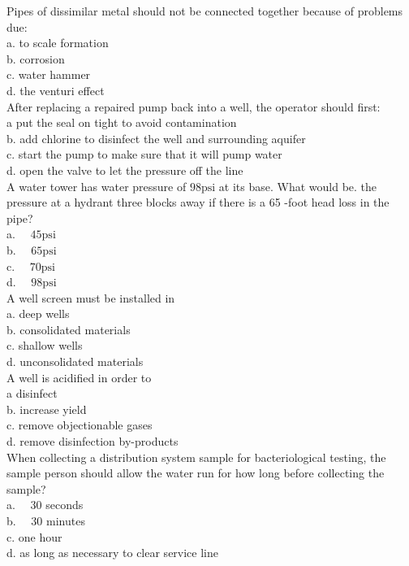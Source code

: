 Pipes of dissimilar metal should not be connected together because of problems due:\\
a. to scale formation\\
b. corrosion\\
c. water hammer\\
d. the venturi effect\\

After replacing a repaired pump back into a well, the operator should first:\\
a put the seal on tight to avoid contamination\\
b. add chlorine to disinfect the well and surrounding aquifer\\
c. start the pump to make sure that it will pump water\\
d. open the valve to let the pressure off the line \\

A water tower has water pressure of $98 \mathrm{psi}$ at its base. What would be. the pressure at a hydrant three blocks away if there is a 65 -foot head loss in the pipe?\\
a. $\quad 45 \mathrm{psi}$\\
b. $\quad 65 \mathrm{psi}$\\
c. $\quad 70 \mathrm{psi}$\\
d. $\quad 98 \mathrm{psi}$\\

A well screen must be installed in\\
a. deep wells\\
b. consolidated materials\\
c. shallow wells\\
d. unconsolidated materials\\

A well is acidified in order to\\
a disinfect\\
b. increase yield\\
c. remove objectionable gases\\
d. remove disinfection by-products\\

When collecting a distribution system sample for bacteriological testing, the sample person should allow the water run for how long before collecting the sample?\\
a. $\quad 30$ seconds\\
b. $\quad 30$ minutes\\
c. one hour\\
d. as long as necessary to clear service line\\

